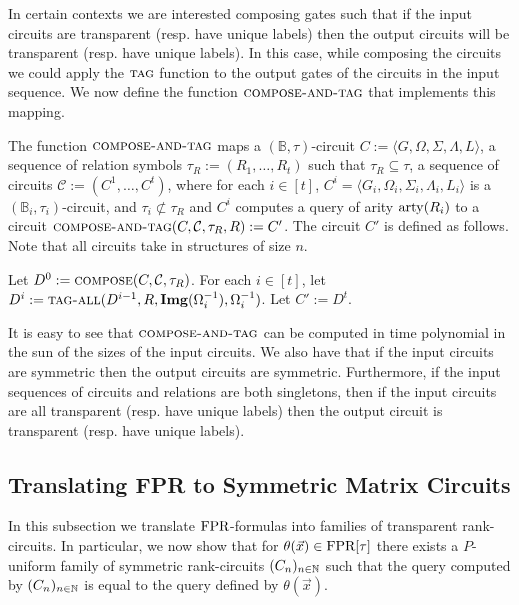 \documentclass[../paper.tex]{subfiles}
\begin{document}
In certain contexts we are interested composing gates such that if the input
circuits are transparent (resp. have unique labels) then the output circuits
will be transparent (resp. have unique labels). In this case, while composing
the circuits we could apply the ${\normalfont\textsc{tag}}$ function to the output gates of the
circuits in the input sequence. We now define the function
${\normalfont\textsc{compose-and-tag}}$ that implements this mapping.

\begin{definition}
  The function ${\normalfont\textsc{compose-and-tag}}$ maps a $(\mathbb{B}, \tau)$-circuit $C :=
  \langle G, \Omega, \Sigma, \Lambda, L \rangle$, a sequence of relation symbols
  $\tau_R := (R_1, \ldots, R_t)$ such that $\tau_R \subseteq \tau$, a sequence
  of circuits $\mathcal{C} := ( C^1, \ldots, C^t)$, where for each $i \in [t]$,
  $C^i = \langle G_i, \Omega_i, \Sigma_i, \Lambda_i, L_i \rangle$ is a
  $(\mathbb{B}_i, \tau_i)$-circuit, and $\tau_i \not\subset \tau_R$ and $C^i$
  computes a query of arity $\mathrm{arty}(R_i)$ to a circuit ${\normalfont\textsc{compose-and-tag}}(C,
  \mathcal{C}, \tau_R, R) := C'$. The circuit $C'$ is defined as follows. Note
  that all circuits take in structures of size $n$.
  
  Let $D^0 := {\normalfont\textsc{compose}}(C, \mathcal{C}, \tau_R)$. For each $i \in [t]$, let
  $D^{i} := {\normalfont\textsc{tag-all}}(D^{i-1}, R, \text{\textbf{Img}}(\Omega^{-1}_i), \Omega^{-1}_i)$. Let
  $C' := D^t$.
\end{definition}

It is easy to see that ${\normalfont\textsc{compose-and-tag}}$ can be computed in time polynomial
in the sun of the sizes of the input circuits. We also have that if the input
circuits are symmetric then the output circuits are symmetric. Furthermore, if
the input sequences of circuits and relations are both singletons, then if the
input circuits are all transparent (resp. have unique labels) then the output
circuit is transparent (resp. have unique labels).

\subsection{Translating FPR to Symmetric Matrix Circuits}
In this subsection we translate $\text{\upshape FPR}$-formulas into families of transparent
rank-circuits. In particular, we now show that for $\theta(\vec{x}) \in
\text{\upshape FPR}[\tau]$ there exists a $P$-uniform family of symmetric rank-circuits
$(C_n)_{n \in \mathbb{N}}$ such that the query computed by $(C_n)_{n \in \mathbb{N}}$ is
equal to the query defined by $\theta (\vec{x})$.
\end{document}

